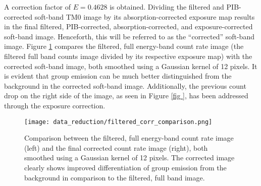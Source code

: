 A correction factor of \(E = 0.4628\) is obtained. Dividing the filtered and PIB-corrected soft-band TM0 image by its absorption-corrected exposure map results in the final filtered, PIB-corrected, absorption-corrected, and exposure-corrected soft-band image. Henceforth, this will be referred to as the \enquote{corrected} soft-band image. Figure \ref{fig:comparison_filt_corr} compares the filtered, full energy-band count rate image (the filtered full band counts image divided by its respective exposure map) with the corrected soft-band image, both smoothed using a Gaussian kernel of 12 pixels. It is evident that group emission can be much better distinguished from the background in the corrected soft-band image. Additionally, the previous count drop on the right side of the image, as seen in Figure \ref{fig
}, has been addressed through the exposure correction.
\begin{figure}[htbp]
    \centering
    \texttt{[image: data\_reduction/filtered\_corr\_comparison.png]}
    \caption{Comparison between the filtered, full energy-band count rate image (left) and the final corrected count rate image (right), both smoothed using a Gaussian kernel of 12 pixels. The corrected image clearly shows improved differentiation of group emission from the background in comparison to the filtered, full band image.}
    \label{fig:comparison_filt_corr}
\end{figure}
